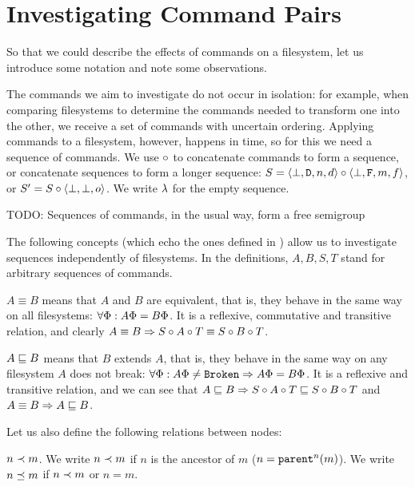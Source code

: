 

\section{Investigating Command Pairs}\label{section_axioms}


So that we could describe the effects of commands on a filesystem, let us introduce some notation
and note some observations.

The commands we aim to investigate do not occur in isolation:
for example, when comparing filesystems to determine the commands needed to transform one into the other,
we receive a set of commands with uncertain ordering.
Applying commands to a filesystem, however, happens in time,
so for this we need a sequence of commands.
We use $\circ$ to concatenate commands to form a sequence, or concatenate sequences to form a longer sequence:
$S=\langle{\bot,\mathtt{D},n,d}\rangle\circ\langle{\bot,\mathtt{F},m,f}\rangle$, or $S'=S\circ\langle{\bot,\bot,o}\rangle$.
We write $\lambda$ for the empty sequence.

TODO: Sequences of commands, in the usual way,  form a free
semigroup

The following concepts 
(which echo the ones defined in \cite{NREC})
allow us to investigate sequences independently of filesystems.
In the definitions, $A,B,S,T$ stand for arbitrary sequences of commands.

\begin{mydef}
$A\equiv B$ means that $A$ and $B$ are equivalent,
that is, they behave in the same way on
all filesystems: $\forall \Phi: A\Phi=B\Phi$.
It is a reflexive, commutative and transitive relation,
and clearly
$ A\equiv B \Rightarrow S\circ A\circ T\equiv S\circ B\circ T $.
\end{mydef}

\begin{mydef}
$A\sqsubseteq B$ means that $B$ extends $A$,
that is, they behave in the same way
on any filesystem $A$ does not break:
$\forall \Phi: A\Phi\neq\mathtt{Broken}\Rightarrow A\Phi=B\Phi$.
It is a reflexive and transitive relation,
and we can see that
$ A\sqsubseteq B \Rightarrow S\circ A\circ T\sqsubseteq S\circ B\circ T$
and
$ A\equiv B \Rightarrow A\sqsubseteq B$.
\end{mydef}

Let us also define the following relations between nodes:

\begin{mydef}{$n\prec m$.}
We write $n\prec m$ if $n$ is the ancestor of $m$ ($n=\mathtt{parent}^n(m)$). %
We write $n\preceq m$ if $n\prec m$ or $n=m$.
\end{mydef}

